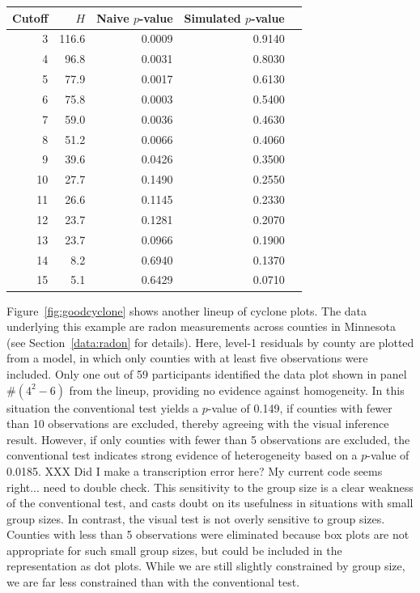 \documentclass[12pt]{article} %
\newcommand{\hh}[1]{{\color{orange} #1}}
\newcommand{\al}[1]{{\color{ForestGreen} #1}}
\newcommand{\alnote}[1]{\todo[inline,color=green!40]{#1}} %
\begin{document}
\begin{table}[ht]
\centering
\begin{tabular}{rrrrr}
  \hline
 Cutoff & $H$ & Naive $p$-value  & Simulated $p$-value \\ 
  \hline
  3 & 116.6 & 0.0009 & 0.9140 \\ 
  4 & 96.8 & 0.0031 & 0.8030 \\ 
  5 & 77.9 & 0.0017 & 0.6130 \\ 
  6 & 75.8 & 0.0003 & 0.5400 \\ 
  7 & 59.0 & 0.0036 & 0.4630 \\ 
  8 & 51.2 & 0.0066 & 0.4060 \\ 
  9 & 39.6 & 0.0426 & 0.3500 \\ 
  10 & 27.7 & 0.1490 & 0.2550 \\ 
  11 & 26.6 & 0.1145 & 0.2330 \\ 
  12 & 23.7 & 0.1281 & 0.2070 \\ 
  13 & 23.7 & 0.0966 & 0.1900 \\ 
  14 & 8.2 & 0.6940 & 0.1370 \\ 
  15 & 5.1 & 0.6429 & 0.0710 \\ 
   \hline
\end{tabular}
\end{table}
Figure~\ref{fig:goodcyclone} shows another lineup of cyclone plots.  The data underlying this example are radon measurements across counties in Minnesota (see Section~\ref{data:radon} for details).
Here, level-1 residuals by county are plotted from a model, in which only counties with at least five observations were included. 
Only one out of  59 participants identified the data plot shown in panel \#$(4^2 - 6)$ from the lineup, providing no evidence against homogeneity. In this situation the conventional test yields a $p$-value of 0.149, if counties with fewer than 10 observations are excluded, thereby agreeing with the visual inference result. However, if only counties with fewer than 5 observations are excluded, the conventional test indicates strong evidence of heterogeneity based on a $p$-value of 0.0185.
\al{XXX Did I make a transcription error here? My current code seems right... need to double check.}
 This sensitivity to the group size is a clear weakness of the conventional test, and casts doubt on its usefulness in situations with small group sizes. In contrast, the visual test is not overly sensitive to group sizes. Counties with less than 5 observations were eliminated because box plots are not appropriate for such small group sizes, but could be included in the representation as dot plots. While we are still slightly constrained by group size, we are far less constrained than with the conventional test.
 
\end{document}
